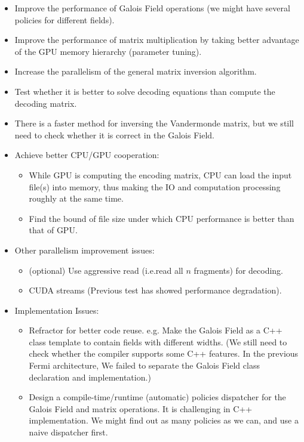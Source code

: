 \documentclass[a4paper]{article}
\begin{document}
\begin{itemize}
	\item Improve the performance of Galois Field operations (we might have several policies for different fields).
	\item Improve the performance of matrix multiplication by taking better advantage of the GPU memory hierarchy (parameter tuning).
	\item Increase the parallelism of the general matrix inversion algorithm.
	\item Test whether it is better to solve decoding equations than compute the decoding matrix.
	\item There is a faster method for inversing the Vandermonde matrix, but we still need to check whether it is correct in the Galois Field. 
	\item Achieve better CPU/GPU cooperation:
	\begin{itemize}
		\item While GPU is computing the encoding matrix, CPU can load the input file(s) into memory,
thus making the IO and computation processing roughly at the same time.
		\item Find the bound of file size under which CPU performance is better than that of GPU.
	\end{itemize}
	\item Other parallelism improvement issues: 
	\begin{itemize}
		\item (optional) Use aggressive read (i.e.read all $n$ fragments) for decoding. 
		\item CUDA streams (Previous test has showed performance degradation).
	\end{itemize}
	\item Implementation Issues:
	\begin{itemize}
		\item Refractor for better code reuse. e.g. Make the Galois Field as a C++ class template to contain fields with different widths. (We still need to check whether the compiler supports some C++ features. In the previous Fermi architecture, We failed to separate the Galois Field class declaration and implementation.)
		\item Design a compile-time/runtime (automatic) policies dispatcher for the Galois Field and matrix operations. 
It is challenging in C++ implementation. We might find out as many policies as we can, and use a naive dispatcher first.
	\end{itemize}
\end{itemize}
\end{document}
